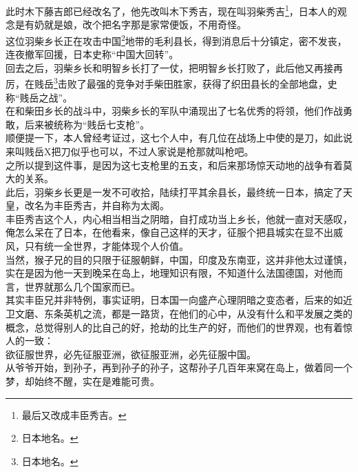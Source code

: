 \begin{multicols}{\theparacolNo}
此时木下藤吉郎已经改名了，他先改叫木下秀吉，现在叫羽柴秀吉\footnote{最后又改成丰臣秀吉。}，日本人的观念是有奶就是娘，改个把名字那是家常便饭，不用奇怪。\\

这位羽柴乡长正在攻击中国\footnote{日本地名。}地带的毛利县长，得到消息后十分镇定，密不发丧，连夜撤军回援，日本史称“中国大回转”。\\

回去之后，羽柴乡长和明智乡长打了一仗，把明智乡长打败了，此后他又再接再厉，在贱岳\footnote{日本地名。}击败了最强的竞争对手柴田胜家，获得了织田县长的全部地盘，史称“贱岳之战”。\\

在和柴田乡长的战斗中，羽柴乡长的军队中涌现出了七名优秀的将领，他们作战勇敢，后来被统称为“贱岳七支枪”。\\

顺便提一下，本人曾经考证过，这七个人中，有几位在战场上中使的是刀，如此说来叫贱岳X把刀似乎也可以，不过人家说是枪那就叫枪吧。\\

之所以提到这件事，是因为这七支枪里的五支，和后来那场惊天动地的战争有着莫大的关系。\\

此后，羽柴乡长更是一发不可收拾，陆续打平其余县长，最终统一日本，搞定了天皇，改名为丰臣秀吉，并自称为太阁。\\

丰臣秀吉这个人，内心相当相当之阴暗，自打成功当上乡长，他就一直对天感叹，俺怎么呆在了日本，在他看来，像自己这样的天才，征服个把县城实在显不出威风，只有统一全世界，才能体现个人价值。\\

当然，猴子兄的目的只限于征服朝鲜，中国，印度及东南亚，这并非他太过谨慎，实在是因为他一天到晚呆在岛上，地理知识有限，不知道什么法国德国，对他而言，世界就那么几个国家而已。\\

其实丰臣兄并非特例，事实证明，日本国一向盛产心理阴暗之变态者，后来的如近卫文磨、东条英机之流，都是一路货，在他们的心中，从没有什么和平发展之类的概念，总觉得别人的比自己的好，抢劫的比生产的好，而他们的世界观，也有着惊人的一致：\\

欲征服世界，必先征服亚洲，欲征服亚洲，必先征服中国。\\

从爷爷开始，到孙子，再到孙子的孙子，这帮孙子几百年来窝在岛上，做着同一个梦，却始终不醒，实在是难能可贵。\\


\end{multicols}
